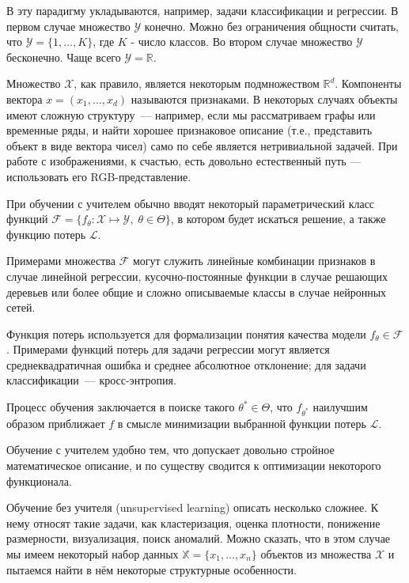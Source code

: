 В эту парадигму укладываются, например, задачи классификации и регрессии.
В первом случае множество $\mathcal{Y}$ конечно. Можно без ограничения общности считать, что $\mathcal{Y} = \{1, \ldots, K\}$, где $K$ - число классов.
Во втором случае множество $\mathcal{Y}$ бесконечно. Чаще всего $\mathcal{Y} = \mathbb{R}$.

Множество $\mathcal{X}$, как правило, является некоторым подмножеством $\mathbb{R}^d$.
Компоненты вектора $x = (x_1, \ldots, x_d)$ называются признаками.
В некоторых случаях объекты имеют сложную структуру~--- например, если мы рассматриваем графы или временные ряды,
и найти хорошее признаковое описание (т.е., представить объект в виде вектора чисел) само по себе является нетривиальной задачей.
При работе с изображениями, к счастью, есть довольно естественный путь --- использовать его RGB-представление.

При обучении с учителем обычно вводят некоторый параметрический класс функций $\mathcal{F} = \{f_\theta\colon \mathcal{X} \mapsto \mathcal{Y}, \; \theta \in \Theta\}$,
в котором будет искаться решение, {а также функцию потерь $\mathcal{L}$}.

Примерами множества $\mathcal{F}$ могут служить линейные комбинации признаков в случае линейной регрессии, 
кусочно-постоянные функции в случае решающих деревьев или более общие и сложно описываемые классы в случае нейронных сетей.

Функция потерь используется для формализации понятия качества модели $f_\theta \in \mathcal{F}$.
Примерами функций потерь для задачи регрессии могут является среднеквадратичная ошибка и среднее абсолютное отклонение;
для задачи классификации~--- кросс-энтропия.

Процесс обучения заключается в поиске такого $\theta^* \in \Theta$, что $f_{\theta^*}$ наилучшим образом приближает $f$
в смысле минимизации выбранной функции потерь $\mathcal{L}$.

Обучение с учителем удобно тем, что допускает довольно стройное математическое описание, и по существу сводится к оптимизации некоторого функционала.
\medskip

Обучение без учителя (unsupervised learning) описать несколько сложнее.
К нему относят такие задачи, как кластеризация, оценка плотности, понижение размерности, визуализация, поиск аномалий.
Можно сказать, что в этом случае мы имеем некоторый набор данных $\mathbb{X} = \{x_1, \ldots, x_n\}$ объектов из множества $\mathcal{X}$
и пытаемся найти в нём некоторые структурные особенности.
\bigskip

